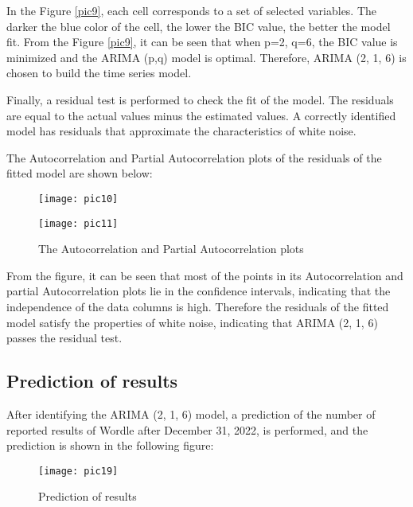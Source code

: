 \documentclass[12pt]{article}  %
\begin{document}
In the Figure \ref{pic9}, each cell corresponds to a set of selected variables. The darker the blue color of the cell, the lower the BIC value, the better the model fit. From the Figure \ref{pic9}, it can be seen that when p=2, q=6, the BIC value is minimized and the ARIMA (p,q) model is optimal. Therefore, ARIMA (2, 1, 6) is chosen to build the time series model.

Finally, a residual test is performed to check the fit of the model. The residuals are equal to the actual values minus the estimated values. A correctly identified model has residuals that approximate the characteristics of white noise.

The Autocorrelation and Partial Autocorrelation plots of the residuals of the fitted model are shown below:

\begin{figure}[H]
	\centering
	\begin{minipage}{0.49\linewidth}
		\centering
		\texttt{[image: pic10]}
		\label{pic10}%
	\end{minipage}
	\begin{minipage}{0.49\linewidth}
		\centering
		\texttt{[image: pic11]}
		\label{pic11}%
	\end{minipage}
	\caption{The Autocorrelation and Partial Autocorrelation plots}
\end{figure}
\vspace{-0.5cm}

From the figure, it can be seen that most of the points in its Autocorrelation and partial Autocorrelation plots lie in the confidence intervals, indicating that the independence of the data columns is high. Therefore the residuals of the fitted model satisfy the properties of white noise, indicating that ARIMA (2, 1, 6) passes the residual test.


\subsection{Prediction of results}
After identifying the ARIMA (2, 1, 6) model, a prediction of the number of reported results of Wordle after December 31, 2022, is performed, and the prediction is shown in the following figure:

\begin{figure}[htbp]  %
	\centering  %
	\texttt{[image: pic19]} %
	\caption{Prediction of results}  
	\label{pic19}
\end{figure}
\vspace{-0.5cm}
\end{document}
